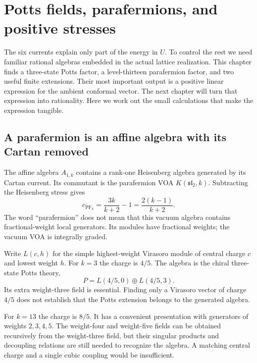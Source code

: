 \chapter{Potts fields, parafermions, and positive stresses}
\label{ch:factors}

The six currents explain only part of the energy in $U$. To control
the rest we need familiar rational algebras embedded in the actual
lattice realization. This chapter finds a three-state Potts factor,
a level-thirteen parafermion factor, and two useful finite extensions.
Their most important output is a positive linear expression for the
ambient conformal vector. The next chapter will turn that expression
into rationality. Here we work out the small calculations that make
the expression tangible.

\section{A parafermion is an affine algebra with its Cartan removed}

The affine algebra $A_{1,k}$ contains a rank-one Heisenberg algebra
generated by its Cartan current. Its commutant is the parafermion VOA
$K(\mathfrak{sl}_2,k)$. Subtracting the Heisenberg stress gives
\begin{equation}\label{eq:c-pf-central}
 c_{\mathrm{PF}_k}=\frac{3k}{k+2}-1
                  =\frac{2(k-1)}{k+2}.
\end{equation}
The word ``parafermion'' does not mean that this vacuum algebra contains
fractional-weight local generators. Its modules have fractional weights;
the vacuum VOA is integrally graded.

Write $L(c,h)$ for the simple highest-weight Virasoro module of central
charge $c$ and lowest weight $h$.
For $k=3$ the charge is $4/5$. The algebra is the chiral three-state
Potts theory,
\[
 P=L(4/5,0)\oplus L(4/5,3).
\]
Its extra weight-three field is essential. Finding only a Virasoro
vector of charge $4/5$ does not establish that the Potts extension
belongs to the generated algebra.

For $k=13$ the charge is $8/5$. It has a convenient presentation with
generators of weights $2,3,4,5$. The weight-four and weight-five fields
can be obtained recursively from the weight-three field, but their
singular products and decoupling relations are still needed to
recognize the algebra. A matching central charge and a single cubic
coupling would be insufficient.


